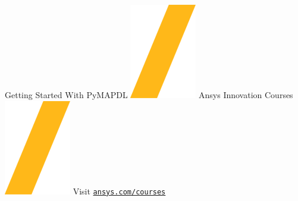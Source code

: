 \documentclass[9pt,landscape]{article}
\def\code#1{\texttt{#1}}
\begin{document}
\begin{center}
Getting Started With PyMAPDL \includegraphics[height=\fontcharht\font`\S]{slash.png} Ansys Innovation Courses \includegraphics[height=\fontcharht\font`\S]{slash.png} Visit \code{\href{https://courses.ansys.com/}{ansys.com/courses}}
\end{center}
\end{document}

